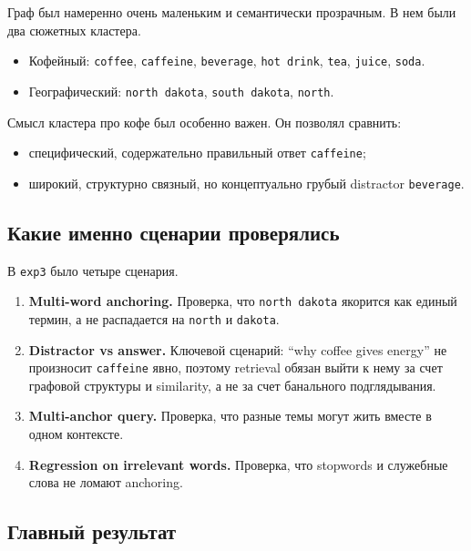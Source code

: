 Граф был намеренно очень маленьким и семантически прозрачным. В нем были два
сюжетных кластера.

\begin{itemize}[leftmargin=2em]
\item Кофейный: \texttt{coffee}, \texttt{caffeine}, \texttt{beverage},
\texttt{hot drink}, \texttt{tea}, \texttt{juice}, \texttt{soda}.
\item Географический: \texttt{north dakota}, \texttt{south dakota},
\texttt{north}.
\end{itemize}

Смысл кластера про кофе был особенно важен. Он позволял сравнить:

\begin{itemize}[leftmargin=2em]
\item специфический, содержательно правильный ответ \texttt{caffeine};
\item широкий, структурно связный, но концептуально грубый distractor
\texttt{beverage}.
\end{itemize}

\subsection{Какие именно сценарии проверялись}

В \texttt{exp3} было четыре сценария.

\begin{enumerate}[leftmargin=2em]
\item \textbf{Multi-word anchoring.} Проверка, что \texttt{north dakota}
якорится как единый термин, а не распадается на \texttt{north} и
\texttt{dakota}.
\item \textbf{Distractor vs answer.} Ключевой сценарий:
``why coffee gives energy'' не произносит \texttt{caffeine} явно, поэтому
retrieval обязан выйти к нему за счет графовой структуры и similarity, а не за
счет банального подглядывания.
\item \textbf{Multi-anchor query.} Проверка, что разные темы могут жить вместе в
одном контексте.
\item \textbf{Regression on irrelevant words.} Проверка, что stopwords и
служебные слова не ломают anchoring.
\end{enumerate}

\subsection{Главный результат}


